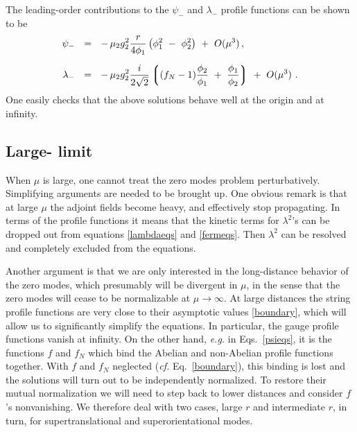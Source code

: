 \documentclass[12pt]{article}
\newcommand{\lgr}{\left\lgroup}
\newcommand{\rgr}{\right\rgroup}
\begin{document}
	The leading-order contributions to the $ \psi_- $ and $ \lambda_- $ profile functions can be shown to be 
\begin{align}
%
\notag
	\psi_- & ~~=~~ -\, \mu_2 g_2^2 \frac{r}{4\phi_1} \left( \phi_1^2 ~-~ \phi_2^2 \right)  ~+~ O(\mu^3)\,,
	\\[2mm]
%
\label{firstorder}
	\lambda_- & ~~=~~ -\, \mu_2 g_2^2 \frac{i}{2\sqrt{2}} \lgr (f_N - 1) \frac{\phi_2}{\phi_1} ~+~ \frac{\phi_1}{\phi_2} \rgr ~+~ O(\mu^3)~.
\end{align}
	One easily checks that the above solutions behave well at the origin and at infinity.

\subsection{Large-\boldmath{$\mu$} limit}
	When $ \mu $ is large, one cannot treat the zero modes problem perturbatively.
	Simplifying arguments are needed to be brought up.
	One obvious remark is that at large $ \mu $ the adjoint fields become heavy,
	and effectively stop propagating.
	In terms of the profile functions it means that the kinetic terms for $ \lambda^2 $'s 
	can be dropped out from equations \eqref{lambdaeqs} and \eqref{fermeqs}.
	Then $ \lambda^2 $ can be resolved and completely excluded from the equations.
	
	Another argument is that we are only interested in the long-distance behavior
	of the zero modes, which presumably will be divergent in $ \mu $, in the sense that the
	zero modes will cease to be normalizable at $ \mu \to \infty $.
	At large distances the string profile functions are very close to their asymptotic values \eqref{boundary},
	which will allow us to significantly simplify the equations.
	In particular, the gauge profile functions vanish at infinity.
	On the other hand, {\it e.g.} in Eqs.~\eqref{psieqs}, it is the functions $ f $ and $ f_N $ 
	which bind the Abelian and non-Abelian profile functions together.
	With $ f $ and $ f_N $ neglected ({\it cf.} Eq.~\eqref{boundary}), this binding is lost and 
	the solutions will turn out to be independently normalized.
	To restore their mutual normalization we will need to step back to lower distances and consider
	$ f $'s nonvanishing.
	We therefore deal with two cases, large $ r $ and intermediate $ r $, in turn, for supertranslational
	and superorientational modes.
\end{document}
